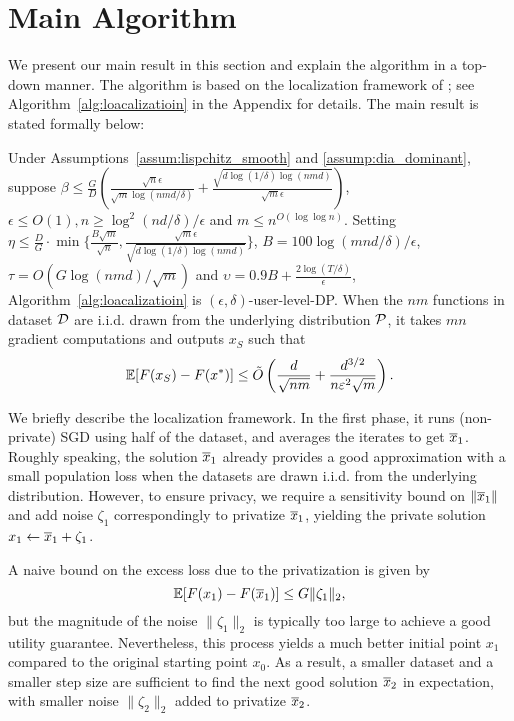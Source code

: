 \section{Main Algorithm}
\label{sec:main_alg}
We present our main result in this section and explain the algorithm in a top-down manner.  The algorithm is based on the localization framework of  
\cite{FKT20}; see Algorithm~\ref{alg:loacalizatioin} in the Appendix for details. The main result is stated formally below:
\begin{theorem}
\label{thm:main_result}
Under Assumptions~\ref{assum:lispchitz_smooth} and \ref{assump:dia_dominant}, suppose $\beta\le\frac{G}{D}(\frac{\sqrt{n}\epsilon}{\sqrt{m}\log(nmd/\delta)}+\frac{\sqrt{d\log(1/\delta)\log(nmd)}}{\sqrt{m}\epsilon})$, $\epsilon\le O(1),n\ge \log^2(nd/\delta)/\epsilon$ and $ m\le n^{O(\log\log n)}$.
Setting $\eta\le\frac{D}{G}\cdot \min\{ \frac{B\sqrt{m}}{\sqrt{n}} ,   \frac{\sqrt{m}\epsilon}{\sqrt{d\log(1/\delta)\log( nmd)}}\}$, $B=100\log(mnd/\delta)/\epsilon$, $\tau=O(G\log(nmd)/\sqrt{m})$ and $\upsilon=0.9B+\frac{2\log(T/\delta)}{\epsilon}$, Algorithm~\ref{alg:loacalizatioin}  is $(\epsilon,\delta)$-user-level-DP. 
When the $nm$ functions in dataset $\mathcal{D}$ are i.i.d. drawn from the underlying distribution $\mathcal{P}$, it takes $mn$ gradient computations and outputs $x_S$ such that
    \begin{align*}
        \operatorname*{\mathbb{E}}[F(x_S)-F(x^*)]\le \Tilde{O} \left(\frac{d}{\sqrt{nm}}+\frac{d^{3/2}}{n\varepsilon^2\sqrt{m}} \right).
    \end{align*}
\end{theorem}

We briefly describe the localization framework.  
In the first phase, it runs (non-private) SGD using half of the dataset, and averages the iterates to get $\overline{x}_1$.
Roughly speaking, the solution $\overline{x}_1$ already provides a good approximation with a small population loss when the datasets are  drawn i.i.d. from the underlying distribution. However, to ensure privacy, we require a  
sensitivity bound on $\|\overline{x}_1\|$ and add noise $\zeta_1$ correspondingly to privatize $\overline{x}_1$, yielding the private solution $x_1 \leftarrow \overline{x}_1 + \zeta_1$.  

A naive bound on the excess loss due to the privatization is given by  
\[
\operatorname*{\mathbb{E}}[F(x_1) - F(\overline{x}_1)] \leq G\|\zeta_1\|_2,
\]  
but the magnitude of the noise $\|\zeta_1\|_2$ is typically too large  
to achieve a good utility guarantee. Nevertheless, this process yields  
a much better initial point $x_1$ compared to the original starting  
point $x_0$. 
As a result, a smaller dataset and a smaller step size are sufficient  
to find the next good solution $\overline{x}_2$ in expectation, with smaller noise $\|\zeta_2\|_2$ added to privatize $\overline{x}_2$.  

